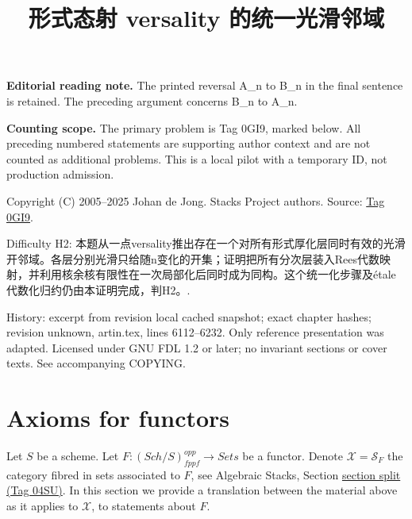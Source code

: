 \documentclass{amsart}
\theoremstyle{plain}
\theoremstyle{definition}
\theoremstyle{remark}
\numberwithin{equation}{subsection}
\def\Sch{\mathit{Sch}}
\begin{document}
\title[Stacks Project, Tag 0GI9]{形式态射 versality 的统一光滑邻域}
\maketitle
\noindent\textbf{Editorial reading note.} The printed reversal A\_n to B\_n in the final sentence is retained. The preceding argument concerns B\_n to A\_n.


\noindent\textbf{Counting scope.} The primary problem is Tag 0GI9, marked below. All preceding numbered statements are supporting author context and are not counted as additional problems. This is a local pilot with a temporary ID, not production admission.


\noindent Copyright (C) 2005--2025 Johan de Jong. Stacks Project authors. Source: \href{https://stacks.math.columbia.edu/tag/0GI9}{Tag 0GI9}.

\noindent Difficulty H2: 本题从一点versality推出存在一个对所有形式厚化层同时有效的光滑开邻域。各层分别光滑只给随n变化的开集；证明把所有分次层装入Rees代数映射，并利用核余核有限性在一次局部化后同时成为同构。这个统一化步骤及étale代数化归约仍由本证明完成，判H2。.

\noindent History: excerpt from revision local cached snapshot; exact chapter hashes; revision unknown, artin.tex, lines 6112--6232. Only reference presentation was adapted. Licensed under GNU FDL 1.2 or later; no invariant sections or cover texts. See accompanying COPYING.

\section{Axioms for functors}
\label{section-axioms-functors}

\noindent
Let $S$ be a scheme. Let $F : (\Sch/S)_{fppf}^{opp} \to \textit{Sets}$ be a
functor. Denote $\mathcal{X} = \mathcal{S}_F$ the category fibred in sets
associated to $F$, see Algebraic Stacks, Section \href{https://stacks.math.columbia.edu/tag/04SU}{section split (Tag 04SU)}.
In this section we provide a translation between the material above
as it applies to $\mathcal{X}$, to statements about $F$.
\end{document}
